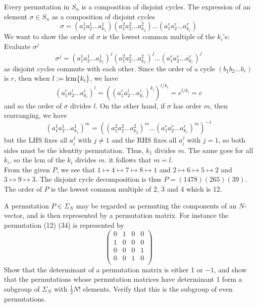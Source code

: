 \documentclass[a4paper]{article}
\begin{document}
\begin{ans}
Every permutation in $S_n$ is a composition of disjoint cycles. The expression of an element $\sigma\in S_n$ as a composition of disjoint cycles
$$\sigma=(a_1^1a_2^1\dots a_{k_1}^1)(a_1^2a_2^2\dots a_{k_2}^2)\dots(a_1^ra_2^r\dots a_{k_r}^r)$$
We want to show the order of $\sigma$ is the lowest common multiple of the $k_i$'s: Evaluate $\sigma^j$
$$\sigma^j=(a_1^1a_2^1\dots a_{k_1}^1)^j(a_1^2a_2^2\dots a_{k_2}^2)^j\dots(a_1^ra_2^r\dots a_{k_r}^r)^j$$
as disjoint cycles commute with each other. Since the order of a cycle $(b_1b_2\dots b_r)$ is $r$, then when $l:=\operatorname{lcm}\{k_i\}$, we have
$$(a_1^ia_2^i\dots a_{k_i}^i)^l=((a_1^ia_2^i\dots a_{k_i}^i)^{k_i})^{l/k_i}=e^{l/k_i}=e$$
and so the order of $\sigma$ divides $l$. On the other hand, if $\sigma$ has order $m$, then rearranging, we have
$$(a_1^1a_2^1\dots a_{k_1}^1)^m=((a_1^2a_2^2\dots a_{k_2}^2)^m\dots(a_1^ra_2^r\dots a_{k_r}^r)^m)^{-1}$$
but the LHS fixes all $a_i^j$ with $j\neq1$ and the RHS fixes all $a_i^j$ with $j=1$, so both sides must be the identity permutation. Thus, $k_1$ divides $m$. The same goes for all $k_i$, so the lcm of the $k_i$ divides $m$. it follows that $m=l$.\\[5pt]
From the given $P$, we see that $1\mapsto 4\mapsto 7\mapsto8\mapsto1$ and $2\mapsto 6\mapsto5\mapsto 2$ and $3\mapsto9\mapsto3$. The disjoint cycle decomposition is thus $P=(1478)(265)(39)$. The order of $P$ is the lowest common multiple of 2, 3 and 4 which is 12.
\end{ans}
\begin{qns}
A permutation $P\in\Sigma_N$ may be regarded as permuting the components of an $N$-vector, and is then represented by a permutation matrix. For instance the permutation (12) (34) is represented by
$$\begin{pmatrix}0&1&0&0\\1&0&0&0\\0&0&0&1\\0&0&1&0\\\end{pmatrix}$$
Show that the determinant of a permutation matrix is either 1 or $−1$, and show that the permutations whose permutation matrices have determinant 1 form a subgroup of $\Sigma_N$ with $\frac{1}{2}N!$ elements. Verify that this is the subgroup of even permutations.
\end{qns}
\end{document}
